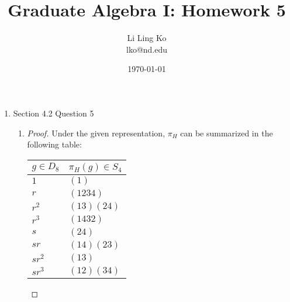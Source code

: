 \documentclass{article}
\begin{document}
\title{Graduate Algebra I: Homework 5}
\author{Li Ling Ko\\ lko@nd.edu}
\date{\today}
\maketitle

\begin{enumerate}
  \item Section 4.2 Question 5
    \begin{enumerate}
      \item
        \begin{proof}
          Under the given representation, $\pi_H$ can be summarized in the
          following table:
          \begin{center}
            \begin{tabular}{|l|l|}
              \hline
              $g\in D_8$ & $\pi_H(g)\in S_4$ \\
              \hline\hline
              $1$     & $(1)$ \\
              $r$     & $(1234)$ \\
              $r^2$   & $(13)(24)$ \\
              $r^3$   & $(1432)$ \\
              $s$     & $(24)$ \\
              $sr$    & $(14)(23)$ \\
              $sr^2$  & $(13)$ \\
              $sr^3$  & $(12)(34)$ \\
            \end{tabular}
          \end{center}
        \end{proof}
    \end{enumerate}
\end{enumerate}
\end{document}
